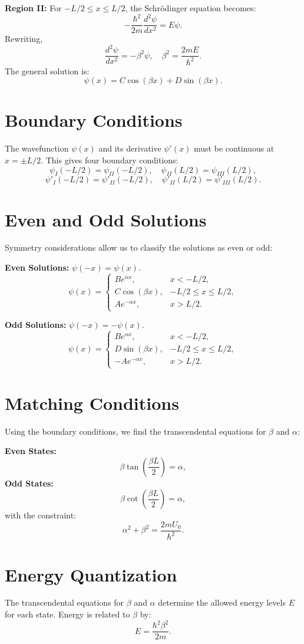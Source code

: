 \documentclass[a4paper,12pt]{article}
\begin{document}
\begin{multicols}{2}
\textbf{Region II:} For \( -L/2 \leq x \leq L/2 \), the Schrödinger equation becomes:
\[
-\frac{\hbar^2}{2m} \frac{d^2\psi}{dx^2} = E\psi.
\]
Rewriting,
\[
\frac{d^2\psi}{dx^2} = -\beta^2 \psi, \quad \beta^2 = \frac{2mE}{\hbar^2}.
\]
The general solution is:
\[
\psi(x) = C \cos(\beta x) + D \sin(\beta x).
\]

\section{Boundary Conditions}
The wavefunction \( \psi(x) \) and its derivative \( \psi'(x) \) must be continuous at \( x = \pm L/2 \). This gives four boundary conditions:
\[
\psi_I(-L/2) = \psi_{II}(-L/2), \quad \psi_{II}(L/2) = \psi_{III}(L/2),
\]
\[
\psi'_I(-L/2) = \psi'_{II}(-L/2), \quad \psi'_{II}(L/2) = \psi'_{III}(L/2).
\]

\section{Even and Odd Solutions}
Symmetry considerations allow us to classify the solutions as even or odd:

\textbf{Even Solutions:} \( \psi(-x) = \psi(x) \).
\[
\psi(x) = 
\begin{cases} 
B e^{\alpha x}, & x < -L/2, \\
C \cos(\beta x), & -L/2 \leq x \leq L/2, \\
A e^{-\alpha x}, & x > L/2.
\end{cases}
\]

\textbf{Odd Solutions:} \( \psi(-x) = -\psi(x) \).
\[
\psi(x) = 
\begin{cases} 
B e^{\alpha x}, & x < -L/2, \\
D \sin(\beta x), & -L/2 \leq x \leq L/2, \\
-A e^{-\alpha x}, & x > L/2.
\end{cases}
\]

\section{Matching Conditions}
Using the boundary conditions, we find the transcendental equations for \( \beta \) and \( \alpha \):

\textbf{Even States:}
\[
\beta \tan\left(\frac{\beta L}{2}\right) = \alpha,
\]
\textbf{Odd States:}
\[
\beta \cot\left(\frac{\beta L}{2}\right) = \alpha,
\]
with the constraint:
\[
\alpha^2 + \beta^2 = \frac{2mU_0}{\hbar^2}.
\]

\section{Energy Quantization}
The transcendental equations for \( \beta \) and \( \alpha \) determine the allowed energy levels \( E \) for each state. Energy is related to \( \beta \) by:
\[
E = \frac{\hbar^2 \beta^2}{2m}.
\]


\end{multicols}
\end{document}
